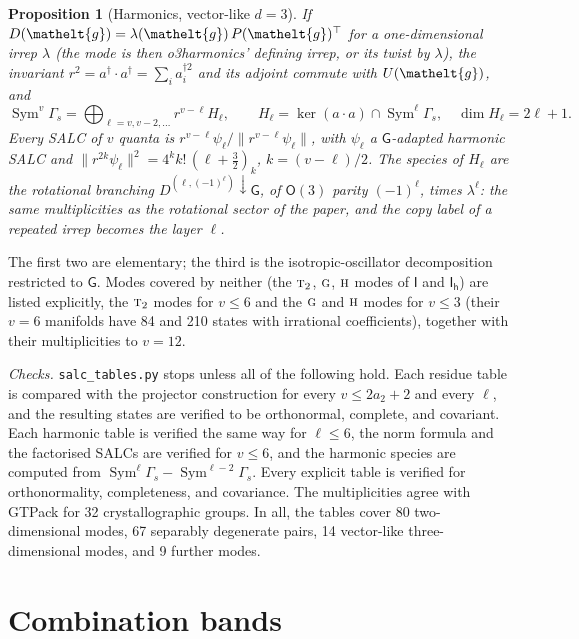 \documentclass[11pt]{article}
\newcommand{\eltfont}[1]{{\let\sigma\eltsigma\mathelt{#1}}}
\newcommand{\grp}[1]{\mathsf{#1}}
\newcommand{\irr}[1]{\text{\normalfont\scshape #1}}
\newcommand{\elt}[1]{\eltfont{#1}}
\newcommand{\restr}[2]{#1\!\downarrow#2}
\newcommand{\irrJp}[2]{D^{(#1,#2)}}
\newcommand{\gel}{\elt{g}}             %
\newcommand{\gmat}{P(\gel)^{\top}}     %
\newtheorem{proposition}{Proposition}
\begin{document}
\begin{proposition}[Harmonics, vector-like $d=3$]
If $D(\gel)=\lambda(\gel)\,\gmat$ for a one-dimensional irrep $\lambda$ (the mode is then o3harmonics' defining irrep, or its twist by $\lambda$), the invariant $r^2=a^\dagger\!\cdot a^\dagger=\sum_ia^{\dagger2}_i$ and its adjoint commute with $U(\gel)$, and
\[
\operatorname{Sym}^{v}\Gamma_s=\bigoplus_{\ell=v,v-2,\ldots}r^{v-\ell}H_\ell,\qquad H_\ell=\ker(a\cdot a)\cap\operatorname{Sym}^{\ell}\Gamma_s,\quad\dim H_\ell=2\ell+1 .
\]
Every SALC of $v$ quanta is $r^{v-\ell}\psi_\ell/\lVert r^{v-\ell}\psi_\ell\rVert$, with $\psi_\ell$ a $\grp{G}$-adapted harmonic SALC and $\lVert r^{2k}\psi_\ell\rVert^2=4^kk!\,(\ell+\tfrac32)_k$, $k=(v-\ell)/2$. The species of $H_\ell$ are the rotational branching $\restr{\irrJp{\ell}{(-1)^\ell}}{\grp{G}}$, of $\grp{O}(3)$ parity $(-1)^\ell$, times $\lambda^\ell$: the same multiplicities as the rotational sector of the paper, and the copy label of a repeated irrep becomes the layer $\ell$.
\end{proposition}

The first two are elementary; the third is the isotropic-oscillator decomposition restricted to $\grp{G}$. Modes covered by neither (the $\irr{t}_{2}$, $\irr{g}$, $\irr{h}$ modes of $\grp{I}$ and $\grp{I_{h}}$) are listed explicitly, the $\irr{t}_{2}$ modes for $v\le6$ and the $\irr{g}$ and $\irr{h}$ modes for $v\le3$ (their $v=6$ manifolds have 84 and 210 states with irrational coefficients), together with their multiplicities to $v=12$.

\emph{Checks.} \texttt{salc\_tables.py} stops unless all of the following hold. Each residue table is compared with the projector construction for every $v\le2a_2+2$ and every $\ell$, and the resulting states are verified to be orthonormal, complete, and covariant. Each harmonic table is verified the same way for $\ell\le6$, the norm formula and the factorised SALCs are verified for $v\le6$, and the harmonic species are computed from $\operatorname{Sym}^{\ell}\Gamma_s-\operatorname{Sym}^{\ell-2}\Gamma_s$. Every explicit table is verified for orthonormality, completeness, and covariance. The multiplicities agree with GTPack for 32 crystallographic groups. In all, the tables cover 80 two-dimensional modes, 67 separably degenerate pairs, 14 vector-like three-dimensional modes, and 9 further modes.

\section{Combination bands}
\end{document}
